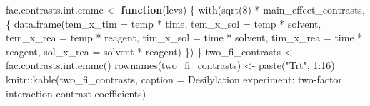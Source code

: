\documentclass[
]{book}
\newenvironment{Shaded}{\begin{snugshade}}{\end{snugshade}}
\newcommand{\AttributeTok}[1]{\textcolor[rgb]{0.77,0.63,0.00}{#1}}
\newcommand{\ControlFlowTok}[1]{\textcolor[rgb]{0.13,0.29,0.53}{\textbf{#1}}}
\newcommand{\DecValTok}[1]{\textcolor[rgb]{0.00,0.00,0.81}{#1}}
\newcommand{\FunctionTok}[1]{\textcolor[rgb]{0.00,0.00,0.00}{#1}}
\newcommand{\NormalTok}[1]{#1}
\newcommand{\OtherTok}[1]{\textcolor[rgb]{0.56,0.35,0.01}{#1}}
\newcommand{\SpecialCharTok}[1]{\textcolor[rgb]{0.00,0.00,0.00}{#1}}
\newcommand{\StringTok}[1]{\textcolor[rgb]{0.31,0.60,0.02}{#1}}
\theoremstyle{definition}
\theoremstyle{definition}
\theoremstyle{definition}
\theoremstyle{definition}
\theoremstyle{remark}
\begin{document}
\begin{Shaded}
\begin{Highlighting}[]
\NormalTok{fac.contrasts.int.emmc }\OtherTok{\textless{}{-}} \ControlFlowTok{function}\NormalTok{(levs) \{}
  \FunctionTok{with}\NormalTok{(}\FunctionTok{sqrt}\NormalTok{(}\DecValTok{8}\NormalTok{) }\SpecialCharTok{*}\NormalTok{ main\_effect\_contrasts, \{}
    \FunctionTok{data.frame}\NormalTok{(}\StringTok{\textquotesingle{}tem\_x\_tim\textquotesingle{}} \OtherTok{=}\NormalTok{ temp }\SpecialCharTok{*}\NormalTok{ time,}
               \StringTok{\textquotesingle{}tem\_x\_sol\textquotesingle{}} \OtherTok{=}\NormalTok{ temp }\SpecialCharTok{*}\NormalTok{ solvent,}
               \StringTok{\textquotesingle{}tem\_x\_rea\textquotesingle{}} \OtherTok{=}\NormalTok{ temp }\SpecialCharTok{*}\NormalTok{ reagent,}
               \StringTok{\textquotesingle{}tim\_x\_sol\textquotesingle{}} \OtherTok{=}\NormalTok{ time }\SpecialCharTok{*}\NormalTok{ solvent,}
               \StringTok{\textquotesingle{}tim\_x\_rea\textquotesingle{}} \OtherTok{=}\NormalTok{ time }\SpecialCharTok{*}\NormalTok{ reagent,}
               \StringTok{\textquotesingle{}sol\_x\_rea\textquotesingle{}} \OtherTok{=}\NormalTok{ solvent }\SpecialCharTok{*}\NormalTok{ reagent)}
\NormalTok{  \})}
\NormalTok{\}}
\NormalTok{two\_fi\_contrasts }\OtherTok{\textless{}{-}} \FunctionTok{fac.contrasts.int.emmc}\NormalTok{()}
\FunctionTok{rownames}\NormalTok{(two\_fi\_contrasts) }\OtherTok{\textless{}{-}} \FunctionTok{paste}\NormalTok{(}\StringTok{"Trt"}\NormalTok{, }\DecValTok{1}\SpecialCharTok{:}\DecValTok{16}\NormalTok{)}
\NormalTok{knitr}\SpecialCharTok{::}\FunctionTok{kable}\NormalTok{(two\_fi\_contrasts, }\AttributeTok{caption =} \StringTok{\textquotesingle{}Desilylation experiment: two{-}factor interaction contrast coefficients\textquotesingle{}}\NormalTok{)}
\end{Highlighting}
\end{Shaded}
\end{document}
